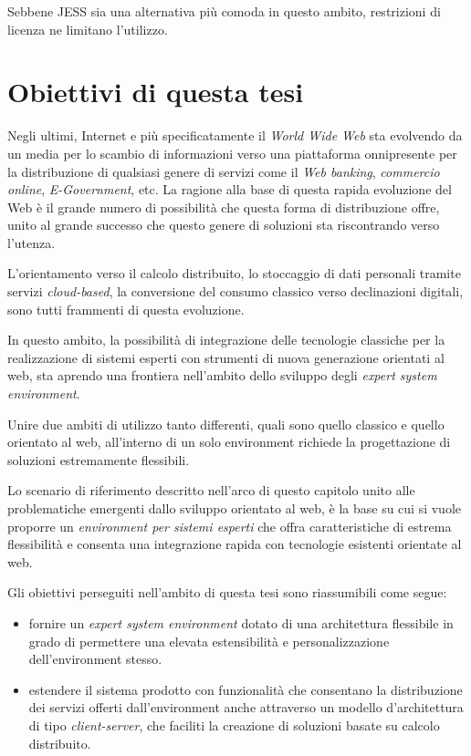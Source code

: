 Sebbene JESS sia una alternativa più comoda in questo ambito, restrizioni di licenza ne limitano l'utilizzo.

\section{Obiettivi di questa tesi}
Negli ultimi, Internet e più specificatamente il \emph{World Wide Web} sta evolvendo da un media per lo scambio di informazioni verso una piattaforma onnipresente per la distribuzione di qualsiasi genere di servizi come il \emph{Web banking}, \emph{commercio online}, \emph{E-Government}, etc. La ragione alla base di questa rapida evoluzione del Web è il grande numero di possibilità che questa forma di distribuzione offre, unito al grande successo che questo genere di soluzioni sta riscontrando verso l'utenza.

L'orientamento verso il calcolo distribuito, lo stoccaggio di dati personali tramite servizi \emph{cloud-based}, la conversione del consumo classico verso declinazioni digitali, sono tutti frammenti di questa evoluzione.

In questo ambito, la possibilità di integrazione delle tecnologie classiche per la realizzazione di sistemi esperti con strumenti di nuova generazione orientati al web, sta aprendo una frontiera nell'ambito dello sviluppo degli \emph{expert system environment}.

Unire due ambiti di utilizzo tanto differenti, quali sono quello classico e quello orientato al web, all'interno di un solo environment richiede la progettazione di soluzioni estremamente flessibili.

Lo scenario di riferimento descritto nell'arco di questo capitolo unito alle problematiche emergenti dallo sviluppo orientato al web, è la base su cui si vuole proporre un \emph{environment per sistemi esperti} che offra caratteristiche di estrema flessibilità e consenta una integrazione rapida con tecnologie esistenti orientate al web.

Gli obiettivi perseguiti nell'ambito di questa tesi sono riassumibili come segue:
\begin{itemize}
	\item fornire un \emph{expert system environment} dotato di una architettura flessibile in grado di permettere una elevata estensibilità e personalizzazione dell'environment stesso.
	\item estendere il sistema prodotto con funzionalità che consentano la distribuzione dei servizi offerti dall'environment anche attraverso un modello d'architettura di tipo \emph{client-server}, che faciliti la creazione di soluzioni basate su calcolo distribuito.
\end{itemize}


